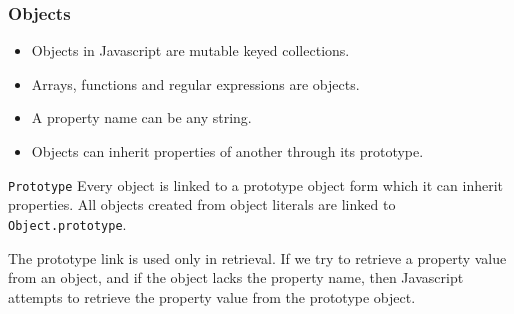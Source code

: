 \begin{frame}[fragile]
  \begin{block}{Literals}
    \scriptsize{
    \begin{verbatim}
    var score = 9000;                                   // Number
    var name = ``David'';                               // String
    var weapons = [``Pistol'', ``Shotgun'', ``Sword'']; // Array
    var player = {                                      // Object
        name: ``Megaman'',
        lifes: 3,
        weapons: [``Buster'', ``Laser'']
    };
    var run = function (param1, param2) {               // Function
    };
    var validation = /^pro/;                            // Regexp
    \end{verbatim}
  \end{block}
\end{frame}

\begin{frame}[fragile]
  \frametitle{Objects}
  \begin{itemize}
    \item Objects in Javascript are mutable keyed collections.
    \item Arrays, functions and regular expressions are objects.
    \item A property name can be any string.
    \item Objects can inherit properties of another through its prototype.
  \end{itemize}
  \begin{block}{\texttt{Prototype}}
    Every object is linked to a prototype object form which it can inherit properties. All objects created from object literals are linked to \texttt{Object.prototype}.

    The prototype link is used only in retrieval. If we try to retrieve a property value from an object, and if the object lacks the property name, then Javascript attempts to retrieve the property value from the prototype object.
  \end{block}
\end{frame}
